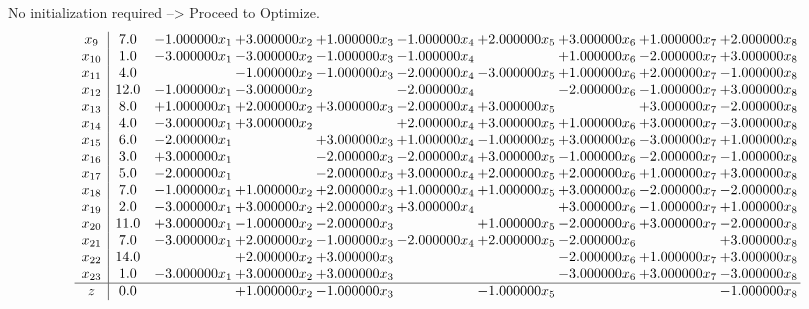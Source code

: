 \documentclass[10pt]{article}
\begin{document}
No initialization required --> Proceed to Optimize. 
\[\begin{array}{c| c c@{\hskip 2pt} c@{\hskip 2pt} c@{\hskip 2pt} c@{\hskip 2pt} c@{\hskip 2pt} c@{\hskip 2pt} c@{\hskip 2pt} c@{\hskip 2pt} }
 x_{9}   &  7.0 & -1.000000 x_{1} & + 3.000000 x_{2} & + 1.000000 x_{3} & -1.000000 x_{4} & + 2.000000 x_{5} & + 3.000000 x_{6} & + 1.000000 x_{7} & + 2.000000 x_{8}\\
 x_{10}   &  1.0 & -3.000000 x_{1} & -3.000000 x_{2} & -1.000000 x_{3} & -1.000000 x_{4} &   & + 1.000000 x_{6} & -2.000000 x_{7} & + 3.000000 x_{8}\\
 x_{11}   &  4.0  &   & -1.000000 x_{2} & -1.000000 x_{3} & -2.000000 x_{4} & -3.000000 x_{5} & + 1.000000 x_{6} & + 2.000000 x_{7} & -1.000000 x_{8}\\
 x_{12}   &  12.0 & -1.000000 x_{1} & -3.000000 x_{2} &   & -2.000000 x_{4} &   & -2.000000 x_{6} & -1.000000 x_{7} & + 3.000000 x_{8}\\
 x_{13}   &  8.0 & + 1.000000 x_{1} & + 2.000000 x_{2} & + 3.000000 x_{3} & -2.000000 x_{4} & + 3.000000 x_{5} &   & + 3.000000 x_{7} & -2.000000 x_{8}\\
 x_{14}   &  4.0 & -3.000000 x_{1} & + 3.000000 x_{2} &   & + 2.000000 x_{4} & + 3.000000 x_{5} & + 1.000000 x_{6} & + 3.000000 x_{7} & -3.000000 x_{8}\\
 x_{15}   &  6.0 & -2.000000 x_{1} &   & + 3.000000 x_{3} & + 1.000000 x_{4} & -1.000000 x_{5} & + 3.000000 x_{6} & -3.000000 x_{7} & + 1.000000 x_{8}\\
 x_{16}   &  3.0 & + 3.000000 x_{1} &   & -2.000000 x_{3} & -2.000000 x_{4} & + 3.000000 x_{5} & -1.000000 x_{6} & -2.000000 x_{7} & -1.000000 x_{8}\\
 x_{17}   &  5.0 & -2.000000 x_{1} &   & -2.000000 x_{3} & + 3.000000 x_{4} & + 2.000000 x_{5} & + 2.000000 x_{6} & + 1.000000 x_{7} & + 3.000000 x_{8}\\
 x_{18}   &  7.0 & -1.000000 x_{1} & + 1.000000 x_{2} & + 2.000000 x_{3} & + 1.000000 x_{4} & + 1.000000 x_{5} & + 3.000000 x_{6} & -2.000000 x_{7} & -2.000000 x_{8}\\
 x_{19}   &  2.0 & -3.000000 x_{1} & + 3.000000 x_{2} & + 2.000000 x_{3} & + 3.000000 x_{4} &   & + 3.000000 x_{6} & -1.000000 x_{7} & + 1.000000 x_{8}\\
 x_{20}   &  11.0 & + 3.000000 x_{1} & -1.000000 x_{2} & -2.000000 x_{3} &   & + 1.000000 x_{5} & -2.000000 x_{6} & + 3.000000 x_{7} & -2.000000 x_{8}\\
 x_{21}   &  7.0 & -3.000000 x_{1} & + 2.000000 x_{2} & -1.000000 x_{3} & -2.000000 x_{4} & + 2.000000 x_{5} & -2.000000 x_{6} &   & + 3.000000 x_{8}\\
 x_{22}   &  14.0  &   & + 2.000000 x_{2} & + 3.000000 x_{3} &    &   & -2.000000 x_{6} & + 1.000000 x_{7} & + 3.000000 x_{8}\\
 x_{23}   &  1.0 & -3.000000 x_{1} & + 3.000000 x_{2} & + 3.000000 x_{3} &    &   & -3.000000 x_{6} & + 3.000000 x_{7} & -3.000000 x_{8}\\
\hline
z    &  0.0  &   & + 1.000000 x_{2} & -1.000000 x_{3} &   & -1.000000 x_{5} &    &   & -1.000000 x_{8}\\
\end{array}\]
\end{document}

